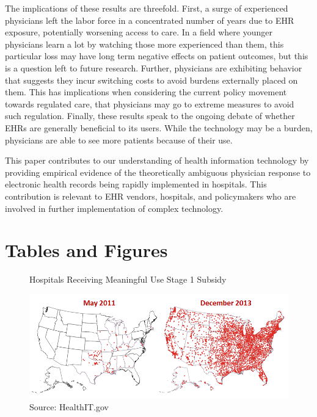 \documentclass[11pt]{article}
\begin{document}
The implications of these results are threefold. First, a surge of experienced physicians left the labor force in a concentrated number of years due to EHR exposure, potentially worsening access to care. In a field where younger physicians learn a lot by watching those more experienced than them, this particular loss may have long term negative effects on patient outcomes, but this is a question left to future research. Further, physicians are exhibiting behavior that suggests they incur switching costs to avoid burdens externally placed on them. This has implications when considering the current policy movement towards regulated care, that physicians may go to extreme measures to avoid such regulation. Finally, these results speak to the ongoing debate of whether EHRs are generally beneficial to its users. While the technology may be a burden, physicians are able to see more patients because of their use. 

This paper contributes to our understanding of health information technology by providing empirical evidence of the theoretically ambiguous physician response to electronic health records being rapidly implemented in hospitals. This contribution is relevant to EHR vendors, hospitals, and policymakers who are involved in further implementation of complex technology. 



\section{Tables and Figures}

\begin{figure}[htp]
    \centering
    \caption{Hospitals Receiving Meaningful Use Stage 1 Subsidy}
    \includegraphics[scale=.6]{Objects/QS-Hospitals-Receiving-Payments-for-MU-and-Adoption.png}
    \caption*{Source: HealthIT.gov}
    \label{fig:meanuse}
\end{figure}
\end{document}
